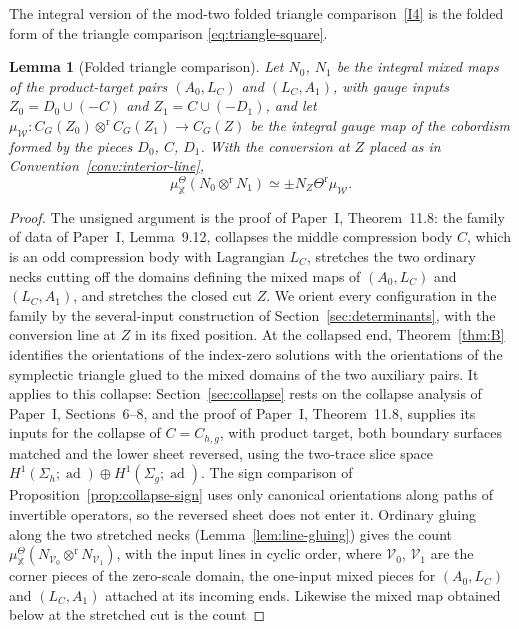 \documentclass[11pt]{amsart}
\newtheorem{lemma}[theorem]{Lemma}
\theoremstyle{definition}
\theoremstyle{remark}
\theoremstyle{plain}
\numberwithin{equation}{section}
\newcommand{\ad}{\operatorname{ad}}
\begin{document}
The integral version of the mod-two folded triangle comparison~\ref{I4} is the folded form of
the triangle comparison \eqref{eq:triangle-square}.

\begin{lemma}[Folded triangle comparison]\label{lem:folded-triangle}
Let $N_0$, $N_1$ be the integral mixed maps of the product-target pairs
$(A_0,L_C)$ and $(L_C,A_1)$, with gauge inputs $Z_0=D_0\cup(-C)$ and
$Z_1=C\cup(-D_1)$, and let $\mu_{\mathscr W}:C_G(Z_0)\otimes^{\mathrm r} C_G(Z_1)\to
C_G(Z)$ be the integral gauge map of the cobordism formed by the pieces
$D_0$, $C$, $D_1$. With the conversion at $Z$ placed as in
Convention~\ref{conv:interior-line},
\[
 \mu_{\mathbb X}^\Theta(N_0\otimes^{\mathrm r}N_1)\simeq\pm N_Z\Theta^{\mathrm r}\mu_{\mathscr W}.
\]
\end{lemma}
\begin{proof}
The unsigned argument is the proof of Paper~I, Theorem~11.8: the family
of data of Paper~I, Lemma~9.12, collapses the middle compression body
$C$, which is an odd compression body with Lagrangian $L_C$, stretches the
two ordinary necks cutting off the domains defining the mixed maps of $(A_0,L_C)$ and
$(L_C,A_1)$, and stretches the closed cut $Z$. We orient every
configuration in the family by the several-input construction of
Section~\ref{sec:determinants}, with the conversion line at $Z$ in its
fixed position. At the collapsed end, Theorem~\ref{thm:B} identifies the
orientations of the index-zero solutions with the orientations of the
symplectic triangle glued to the mixed domains of the two auxiliary pairs. It applies to this
collapse: Section~\ref{sec:collapse} rests on the collapse analysis of
Paper~I, Sections~6--8, and the proof of Paper~I, Theorem~11.8, supplies its
inputs for the collapse of $C=C_{h,g}$, with product target, both boundary surfaces
matched and the lower sheet reversed, using the two-trace slice space
$H^1(\Sigma_h;\ad)\oplus H^1(\Sigma_g;\ad)$. The sign comparison of
Proposition~\ref{prop:collapse-sign} uses only canonical orientations
along paths of invertible operators, so the reversed sheet does not
enter it. Ordinary gluing along
the two stretched necks (Lemma~\ref{lem:line-gluing}) gives the count
$\mu_{\mathbb X}^\Theta(N_{\mathcal V_0}\otimes^{\mathrm r}N_{\mathcal V_1})$, with the
input lines in cyclic order, where $\mathcal V_0$, $\mathcal V_1$ are the
corner pieces of the zero-scale domain, the one-input mixed pieces for
$(A_0,L_C)$ and $(L_C,A_1)$ attached at its incoming ends.
Likewise the mixed map obtained below at the stretched cut is the count

\end{proof}
\end{document}
